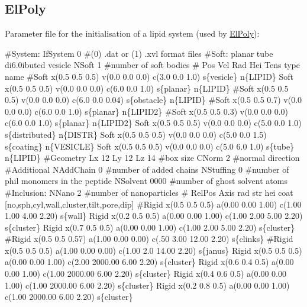 \hypertarget{usage_page_ElPoly_section}{}\subsection{El\+Poly}\label{usage_page_ElPoly_section}
Parameter file for the initialisation of a lipid system (used by \hyperlink{classElPoly}{El\+Poly})\+: 
\begin{DoxyCode}
\textcolor{preprocessor}{#System:}
IfSystem 0          #(0) .dat or (1) .xvl format files
\textcolor{preprocessor}{#Soft: planar tube di6.0ibuted vesicle}
NSoft 1             #number of soft bodies
\textcolor{preprocessor}{#    Pos            Vel            Rad Hei Tens   type      name}
\textcolor{preprocessor}{#Soft x(0.5 0.5 0.5) v(0.0 0.0 0.0) c(3.0 0.0 1.0) s\{vesicle\} n\{LIPID\}}
Soft x(0.5 0.5 0.5) v(0.0 0.0 0.0) c(6.0 0.0 1.0) s\{planar\} n\{LIPID\}
\textcolor{preprocessor}{#Soft x(0.5 0.5 0.5) v(0.0 0.0 0.0) c(6.0 0.0 0.04) s\{obstacle\} n\{LIPID\}}
\textcolor{preprocessor}{#Soft x(0.5 0.5 0.7) v(0.0 0.0 0.0) c(6.0 0.0 1.0) s\{planar\} n\{LIPID2\}}
\textcolor{preprocessor}{#Soft x(0.5 0.5 0.3) v(0.0 0.0 0.0) c(6.0 0.0 1.0) s\{planar\} n\{LIPID2\}}
Soft x(0.5 0.5 0.5) v(0.0 0.0 0.0) c(5.0 0.0 1.0) s\{distributed\} n\{DISTR\}
Soft x(0.5 0.5 0.5) v(0.0 0.0 0.0) c(5.0 0.0 1.5) s\{coating\} n\{VESICLE\}
Soft x(0.5 0.5 0.5) v(0.0 0.0 0.0) c(5.0 6.0 1.0) s\{tube\} n\{LIPID\}
\textcolor{preprocessor}{#Geometry}
Lx 12 Ly 12 Lz 14   #box size
CNorm  2            #normal direction
\textcolor{preprocessor}{#Additional}
NAddChain 0       #number of added chains
NStuffing 0         #number of phil monomers in the peptide
NSolvent  0000      #number of ghost solvent atoms
\textcolor{preprocessor}{#Inclusion:}
NNano 2            #number of nanoparticles
\textcolor{preprocessor}{#     RelPos         Axis                rad  str  hei  coat [no,sph,cyl,wall,cluster,tilt,pore,dip]}
\textcolor{preprocessor}{#Rigid x(0.5 0.5 0.5) a(0.00 0.00 1.00) c(1.00 1.00 4.00 2.20) s\{wall\}}
Rigid x(0.2 0.5 0.5) a(0.00 0.00 1.00) c(1.00 2.00 5.00 2.20) s\{cluster\}
Rigid x(0.7 0.5 0.5) a(0.00 0.00 1.00) c(1.00 2.00 5.00 2.20) s\{cluster\}
\textcolor{preprocessor}{#Rigid x(0.5 0.5 0.57) a(1.00 0.00 0.00) c(.50 3.00 12.00 2.20) s\{clinks\}}
\textcolor{preprocessor}{#Rigid x(0.5 0.5 0.5) a(1.00 0.00 0.00) c(1.00 2.0 14.00 2.20) s\{janus\}}
Rigid x(0.5 0.5 0.5) a(0.00 0.00 1.00) c(2.00 2000.00 6.00 2.20) s\{cluster\}
Rigid x(0.6 0.4 0.5) a(0.00 0.00 1.00) c(1.00 2000.00 6.00 2.20) s\{cluster\}
Rigid x(0.4 0.6 0.5) a(0.00 0.00 1.00) c(1.00 2000.00 6.00 2.20) s\{cluster\}
Rigid x(0.2 0.8 0.5) a(0.00 0.00 1.00) c(1.00 2000.00 6.00 2.20) s\{cluster\}


\end{DoxyCode}
